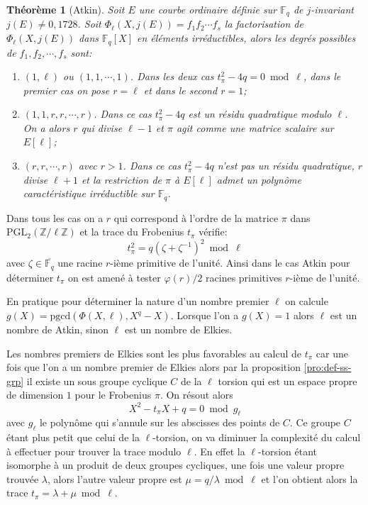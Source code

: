 \documentclass[10pt,a4paper]{book}
\theoremstyle{plain}
\newtheorem{thm}{Théorème}[chapter]
\theoremstyle{definition}
\theoremstyle{definition}
\theoremstyle{definition}
\theoremstyle{definition}
\theoremstyle{definition}
\theoremstyle{remark}
\theoremstyle{remark}
\theoremstyle{definition}
\begin{document}
\begin{thm}[Atkin]\label{thm:Atkin}
Soit $E$ une courbe ordinaire définie sur $\mathbb{F}_q$ de $j$-invariant $j(E) \neq 0, 1728$. Soit $\Phi_{\ell}(X,j(E))=f_1f_2\cdots f_s$ la factorisation de $\Phi_{\ell}(X,j(E))$ dans $\mathbb{F}_q[X]$ en éléments irréductibles, alors les degrés possibles de $f_1,f_2, \cdots , f_s$ sont:
\begin{enumerate}
\item $(1,\ell)$ ou $(1,1, \cdots, 1)$. Dans les deux cas $t_{\pi}^2-4q=0 \bmod \ell $, dans le premier cas on pose $r=\ell$ et dans le second $r=1$;
\item $(1,1,r,r, \cdots,r)$. Dans ce cas $t_{\pi}^2-4q$ est un résidu quadratique modulo $\ell$. On a alors $r$ qui divise $\ell-1$ et $\pi$ agit comme une matrice scalaire sur $E[\ell]$;
\item $(r,r,\cdots,r)$ avec $r>1$. Dans ce cas $t_{\pi}^2-4q$ n'est pas un résidu quadratique, $r$ divise $\ell+1$ et la restriction de $\pi$ à $E[\ell]$ admet un polynôme caractéristique irréductible sur $\mathbb{F}_q$. 
\end{enumerate}
\end{thm}
Dans tous les cas on a $r$ qui correspond à l'ordre de la matrice $\pi$ dans $\mathrm{PGL_2}(\mathbb{Z}/\ell \mathbb{Z})$ et la trace du Frobenius $t_{\pi}$ vérifie:
\begin{equation}
\label{eq:sea:tra}
t_{\pi}^2=q(\zeta + \zeta^{-1})^2 \bmod \ell
\end{equation}
avec $\zeta \in \overline{\mathbb{F}_q}$ une racine $r$-ième primitive de l'unité. Ainsi dans le cas Atkin pour déterminer $t_{\pi}$ on est amené à tester $\varphi(r)/2$ racines primitives $r$-ième de l'unité.

En pratique pour déterminer la nature d'un nombre premier $\ell$ on calcule $g(X)=\mathrm{pgcd}(\Phi(X,\ell),X^q-X)$. Lorsque l'on a $g(X)=1$  alors $\ell$ est un nombre de Atkin, sinon $\ell$ est un nombre de Elkies.

Les nombres premiers de Elkies sont les plus favorables au calcul de $t_{\pi}$ car une fois que l'on a un nombre premier de Elkies alors par la proposition \ref{pro:def-ss-grp} il existe un sous groupe cyclique $C$ de la $\ell$ torsion qui est un espace propre de dimension $1$ pour le Frobenius $\pi$. On résout alors 
\begin{equation*}
X^2-t_{\pi}X+q = 0 \bmod g_{\ell}
\end{equation*} 
avec $g_{\ell}$ le polynôme qui s'annule sur les abscisses des points de $C$.
Ce groupe $C$ étant plus petit que celui de la $\ell$-torsion, on va diminuer la complexité du calcul à effectuer pour trouver la trace modulo $\ell$. En effet la $\ell$-torsion étant isomorphe à un produit de deux groupes cycliques, une fois une valeur propre trouvée $\lambda$, alors l'autre valeur propre est $\mu=q/\lambda \bmod \ell$ et l'on obtient alors la trace $t_{\pi}=\lambda+\mu \bmod \ell$. 
\end{document}
